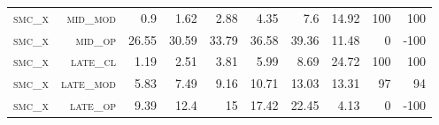\begin{landscape}
\begin{table}[!htbp]
\begin{tabular}{@{}rrrrrrr|rrr@{}}
\footnotesize \textsc{smc\_x}      & \footnotesize \textsc{mid\_mod  }      & \footnotesize 0.9           & \footnotesize 1.62           & \footnotesize 2.88     & \footnotesize 4.35     & \footnotesize 7.6            & \footnotesize 14.92       & \footnotesize  100    & \footnotesize 100    \\
\footnotesize \textsc{smc\_x}      & \footnotesize \textsc{mid\_op   }      & \footnotesize 26.55         & \footnotesize 30.59          & \footnotesize 33.79    & \footnotesize 36.58    & \footnotesize 39.36          & \footnotesize 11.48       & \footnotesize  0      & \footnotesize -100    \\
\footnotesize \textsc{smc\_x}      & \footnotesize \textsc{late\_cl  }      & \footnotesize 1.19          & \footnotesize 2.51           & \footnotesize 3.81     & \footnotesize 5.99     & \footnotesize 8.69           & \footnotesize 24.72       & \footnotesize  100    & \footnotesize 100      \\
\footnotesize \textsc{smc\_x}      & \footnotesize \textsc{late\_mod }      & \footnotesize 5.83          & \footnotesize 7.49           & \footnotesize 9.16     & \footnotesize 10.71    & \footnotesize 13.03          & \footnotesize 13.31       & \footnotesize  97     & \footnotesize 94     \\
\footnotesize \textsc{smc\_x}      & \footnotesize \textsc{late\_op  }      & \footnotesize 9.39          & \footnotesize 12.4           & \footnotesize 15       & \footnotesize 17.42    & \footnotesize 22.45          & \footnotesize 4.13        & \footnotesize  0     & \footnotesize  -100  \\ \bottomrule 
\end{tabular}
\end{table}
\end{landscape}


